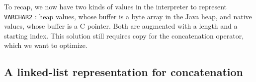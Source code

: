 \documentclass[twoside,11pt,a4paper]{article}
\newcommand{\java}[1]{\textsf{#1}}
\newcommand{\pls}[1]{\small\texttt{#1}\normalsize}
\newcommand{\plstype}[1]{\pls{#1}}
\newcommand{\varchar}{\plstype{VARCHAR2}}
\begin{document}
To recap, we now have two kinds of values in the interpreter to represent \varchar{} : heap values, whose buffer is a \java{byte} array in the Java heap, and native values, whose buffer is a C pointer. Both are augmented with a length and a starting index. This solution still requires copy for the concatenation operator, which we want to optimize.

%
%

\subsection{A linked-list representation for concatenation}
\end{document}
